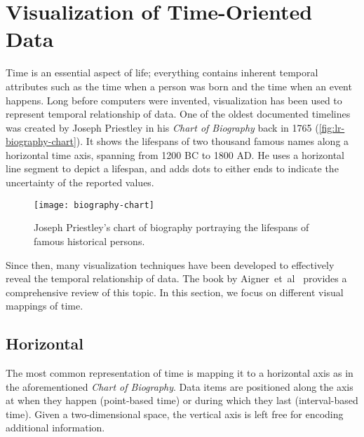 \section{Visualization of Time-Oriented Data}
Time is an essential aspect of life; everything contains inherent temporal attributes such as the time when a person was born and the time when an event happens. Long before computers were invented, visualization has been used to represent temporal relationship of data. One of the oldest documented timelines was created by Joseph Priestley in his \emph{Chart of Biography} back in 1765 (\autoref{fig:lr-biography-chart}). It shows the lifespans of two thousand famous names along a horizontal time axis, spanning from 1200 BC to 1800 AD. He uses a horizontal line segment to depict a lifespan, and adds dots to either ends to indicate the uncertainty of the reported values. 

\begin{figure}[!htb]
	\centering
	\texttt{[image: biography-chart]}
	\caption{Joseph Priestley's chart of biography portraying the lifespans of famous historical
persons. }
	\label{fig:lr-biography-chart}
\end{figure}

Since then, many visualization techniques have been developed to effectively reveal the temporal relationship of data. The book by Aigner~et~al~\cite{Aigner2011} provides a comprehensive review of this topic. In this section, we focus on different visual mappings of time.

\subsection{Horizontal}
The most common representation of time is mapping it to a horizontal axis as in the aforementioned \emph{Chart of Biography}. Data items are positioned along the axis at when they happen (point-based time) or during which they last (interval-based time). Given a two-dimensional space, the vertical axis is left free for encoding additional information.

